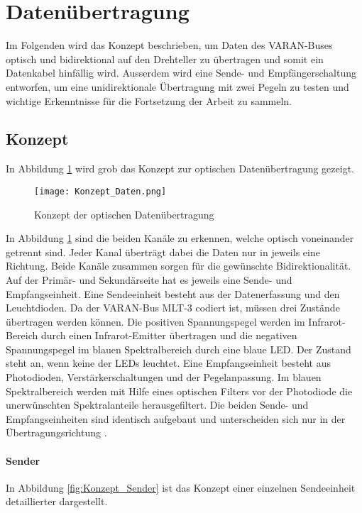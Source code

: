 \section{Datenübertragung}
\label{sec:Daten}
Im Folgenden wird das Konzept beschrieben, um Daten des VARAN-Buses optisch und bidirektional auf den Drehteller zu übertragen und somit ein Datenkabel hinfällig wird. Ausserdem wird eine Sende- und Empfängerschaltung entworfen, um eine unidirektionale Übertragung mit zwei Pegeln zu testen und wichtige Erkenntnisse für die Fortsetzung der Arbeit zu sammeln.  
\subsection{Konzept}
In Abbildung \ref{fig:Konzept_Daten} wird grob das Konzept zur optischen Datenübertragung gezeigt.

\begin{figure}[h]
	\centering
	\texttt{[image: Konzept\_Daten.png]}
	\caption{Konzept der optischen Datenübertragung}\label{fig:Konzept_Daten}
\end{figure}

In Abbildung \ref{fig:Konzept_Daten} sind die beiden Kanäle zu erkennen, welche optisch voneinander getrennt sind. Jeder Kanal überträgt dabei die Daten nur in jeweils eine Richtung. Beide Kanäle zusammen sorgen für die gewünschte Bidirektionalität. Auf der Primär- und Sekundärseite hat es jeweils eine Sende- und Empfangseinheit. 
\newline
Eine Sendeeinheit besteht aus der Datenerfassung und den Leuchtdioden. Da der VARAN-Bus MLT-3 codiert ist, müssen drei Zustände übertragen werden können. Die positiven Spannungspegel werden im Infrarot-Bereich durch einen Infrarot-Emitter übertragen und die negativen Spannungspegel im blauen Spektralbereich durch eine blaue LED. Der Zustand \grqq steht an, wenn keine der LEDs leuchtet.
\newline
Eine Empfangseinheit besteht aus Photodioden, Verstärkerschaltungen und der Pegelanpassung. Im blauen Spektralbereich werden mit Hilfe eines optischen Filters vor der Photodiode die unerwünschten Spektralanteile herausgefiltert.
\newline Die beiden Sende- und Empfangseinheiten sind identisch aufgebaut und unterscheiden sich nur in der Übertragungsrichtung \cite{underwater}.

\paragraph{Sender}
In Abbildung \ref{fig:Konzept_Sender} ist das Konzept einer einzelnen Sendeeinheit detaillierter dargestellt.

